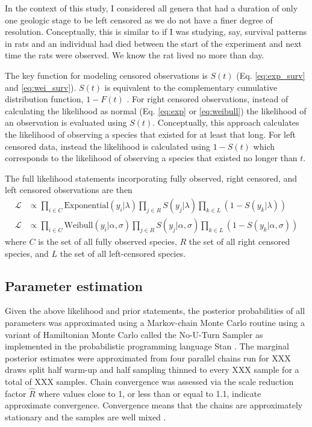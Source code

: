 \documentclass[12pt,letterpaper]{article}
\begin{document}
In the context of this study, I considered all genera that had a duration of only one geologic stage to be left censored as we do not have a finer degree of resolution. Conceptually, this is similar to if I was studying, say, survival patterns in rats and an individual had died between the start of the experiment and next time the rats were observed. We know the rat lived no more than day.

The key function for modeling censored observations is \(S(t)\) (Eq. \ref{eq:exp_surv} and \ref{eq:wei_surv}). \(S(t)\) is equivalent to the complementary cumulative distribution function, \(1 - F(t)\) \citep{Klein2003}. For right censored observations, instead of calculating the likelihood as normal (Eq. \ref{eq:exp} or \ref{eq:weibull}) the likelihood of an observation is evaluated using \(S(t)\). Conceptually, this approach calculates the likelihood of observing a species that existed for at least that long. For left censored data, instead the likelihood is calculated using \(1 - S(t)\) which corresponds to the likelihood of observing a species that existed no longer than \(t\).

The full likelihood statements incorporating fully observed, right censored, and left censored observations are then
\begin{equation}
  \begin{aligned}
    \mathcal{L} &\propto \prod_{i \in C} \mathrm{Exponential}(y_{i} | \lambda) \prod_{j \in R} S(y_{j} | \lambda) \prod_{k \in L} \left(1 - S(y_{k} | \lambda)\right) \\
    \mathcal{L} &\propto \prod_{i \in C} \mathrm{Weibull}(y_{i} | \alpha, \sigma) \prod_{j \in R} S(y_{j} | \alpha, \sigma) \prod_{k \in L} \left(1 - S(y_{k} | \alpha, \sigma)\right)
  \end{aligned}
  \label{eq:censored_likelihood}
\end{equation}
where \(C\) is the set of all fully observed species, \(R\) the set of all right censored species, and \(L\) the set of all left-censored species.


\subsection{Parameter estimation}
Given the above likelihood and prior statements, the posterior probabilities of all parameters was approximated using a Markov-chain Monte Carlo routine using a variant of Hamiltonian Monte Carlo called the No-U-Turn Sampler \citep{Hoffman2014} as implemented in the probabilistic programming language Stan \citep{stan-software:2014}. The marginal posterior estimates were approximated from four parallel chains run for XXX draws split half warm-up and half sampling thinned to every XXX sample for a total of XXX samples. Chain convergence was assessed via the scale reduction factor \(\hat{R}\) where values close to 1, or less than or equal to 1.1, indicate approximate convergence. Convergence means that the chains are approximately stationary and the samples are well mixed \citep{Gelman2013d}.
\end{document}
